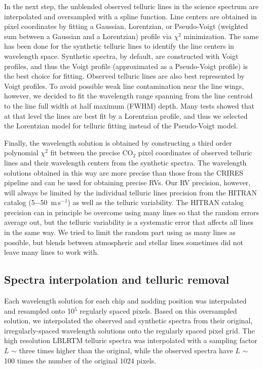 \documentclass{aa}
\begin{document}
In the next step, the unblended observed telluric lines in the science spectrum are interpolated and oversampled with a spline function. 
Line centers are obtained in pixel coordinates by fitting a Gaussian, Lorentzian, or Pseudo-Voigt 
(weighted sum between a Gaussian and a Lorentzian) profile via $\chi^2$ minimization.
The same has been done for the synthetic telluric lines  to identify the line centers in wavelength space.
Synthetic spectra, by default, are constructed with Voigt profiles, and thus the 
Voigt profile (approximated as a Pseudo-Voigt profile) is the best choice for fitting. 
Observed telluric lines are also best represented by Voigt profiles. 
To avoid possible weak line contamination near the line wings, 
however, we decided to fit the wavelength range spanning from the line centroid to the line full width at half maximum (FWHM) depth. 
Many tests showed that at that level the lines are best fit by a Lorentzian profile,
and thus we selected the Lorentzian model  for telluric fitting instead of the Pseudo-Voigt model.

Finally, the wavelength solution is obtained by constructing a  third order polynomial $\chi^2$ fit between the 
precise CO$_2$ pixel coordinates of observed telluric lines and their wavelength centers from the synthetic spectra. 
The wavelength solutions obtained in this way are more precise than those 
from the CRIRES pipeline and can be used for obtaining precise RVs. 
Our RV precision, however, will always be limited by the individual 
telluric lines precision from the HITRAN catalog (5$-$50~m\,s$^{-1}$) as well as
the telluric variability. The HITRAN catalog precision can in principle be overcome using many lines so that the random errors average out, but the
telluric variability is a systematic error that affects all lines in the same way.
We tried to limit the random part  using as many lines as possible,
but blends between atmospheric and stellar lines sometimes did not leave many lines to work with. 


\subsection{Spectra interpolation and telluric removal}
\label{Spectra interpolation and telluric subtraction}


Each wavelength solution for each chip and nodding position was interpolated
and resampled onto 10$^5$ regularly spaced pixels. 
Based on this oversampled solution, we interpolated the observed and synthetic spectra from their original, 
irregularly-spaced wavelength solutions onto the regularly spaced pixel grid. 
The high resolution LBLRTM telluric spectra was interpolated with a sampling factor $L$ $\sim$ three times higher than the original, 
while the observed spectra have $L$ $\sim$ 100 times the number of the original 1024 pixels.
\end{document}
